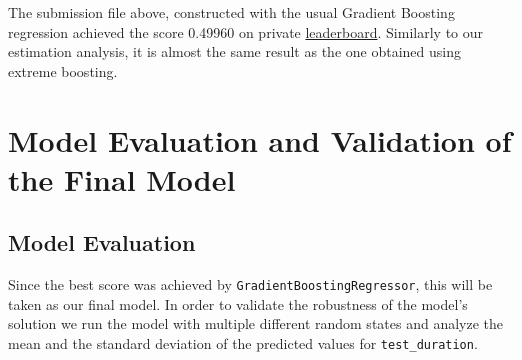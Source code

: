 \documentclass[11pt]{article}
\begin{document}
{    The submission file above, constructed with the usual Gradient Boosting
regression achieved the score 0.49960 on private
\href{https://www.kaggle.com/c/nyc-taxi-trip-duration/leaderboard}{leaderboard}.
Similarly to our estimation analysis, it is almost the same result as
the one obtained using extreme boosting.

\section{Model Evaluation and Validation of the Final
Model}\label{model-evaluation-and-validation-of-the-final-model}

\subsection{Model Evaluation}

\hspace{0.5cm} Since the best score was achieved by \texttt{GradientBoostingRegressor},
this will be taken as our final model. In order to validate the
robustness of the model's solution we run the model with multiple
different random states and analyze the mean and the standard deviation
of the predicted values for \texttt{test\_duration}.

}
\end{document}
